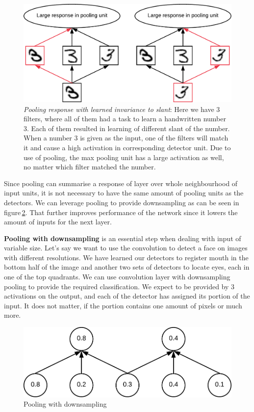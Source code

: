 \begin{figure}[ht]
    \centering
    \includegraphics[width=.8\textwidth]{obrazky-figures/pooling.pdf}
    \caption{\textit{Pooling response with learned invariance to slant}: Here we have 3 filters, where all of them had a task to learn a handwritten number 3. Each of them resulted in learning of different slant of the number. When a number 3 is given as the input, one of the filters will match it and cause a high activation in corresponding detector unit. Due to use of pooling, the max pooling unit has a large activation as well, no matter which filter matched the number.}\label{fig:pooling}
\end{figure}

Since pooling can summarise a response of layer over whole neighbourhood of input units, it is not necessary to have the same amount of pooling units as the detectors. We can leverage pooling to provide downsampling as can be seen in figure\,\ref{fig:downsample}. That further improves performance of the network since it lowers the amount of inputs for the next layer.

\textbf{Pooling with downsampling} is an essential step when dealing with input of variable size. Let's say we want to use the convolution to detect a face on images with different resolutions. We have learned our detectors to register mouth in the bottom half of the image and another two sets of detectors to locate eyes, each in one of the top quadrants. We can use convolution layer with downsampling pooling to provide the required classification. We expect to be provided by 3 activations on the output, and each of the detector has assigned its portion of the input. It does not matter, if the portion contains one amount of pixels or much more.

\begin{figure}[ht]
    \centering
    \includegraphics[width=.6\textwidth]{obrazky-figures/downsampling.pdf}
    \caption{Pooling with downsampling}\label{fig:downsample}
\end{figure}

